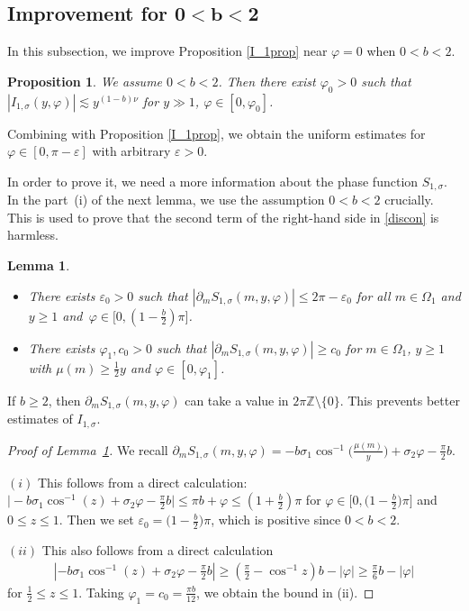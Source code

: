 \documentclass[pdftex]{sigma}
\numberwithin{equation}{section}
\newtheorem{Lemma}[Theorem]{Lemma}
\newtheorem{Proposition}[Theorem]{Proposition}
 { \theoremstyle{definition}
\newtheorem{Definition}[Theorem]{Definition}
\newtheorem{Note}[Theorem]{Note}
\newtheorem{Example}[Theorem]{Example}
\newtheorem{Remark}[Theorem]{Remark} }
\def\e{\varepsilon}
\def\f{\varphi}
\def\m{\mu}
\def\n{\nu}
\def\s{\sigma}
\def\pa{\partial}
\begin{document}
\subsection[Improvement for 0<b<2]{Improvement for $\boldsymbol{0<b<2}$}\label{subsec0b2imp}

In this subsection, we improve Proposition \ref{I_1prop} near $\f=0$ when $0<b<2$.

\begin{Proposition}\label{I_1propimp}
We assume $0<b<2$.
Then there exist $\f_0>0$ such that
$
|I_{1,\s}(y,\f)|\lesssim
y^{(1-b)\n}$ for $y\gg 1$, $ \f\in [0,\f_0]$.
\end{Proposition}

\begin{Remark}
Combining with Proposition \ref{I_1prop}, we obtain the uniform estimates for $\f\in [0,\pi-\e]$ with arbitrary $\e>0$.
\end{Remark}

In order to prove it, we need a more information about the phase function $S_{1,\s}$. In the part~(i) of the next lemma, we use the assumption $0<b<2$ crucially. This is used to prove that the second term of the right-hand side in \eqref{discon} is harmless.

\begin{Lemma}\label{S_1implem}\quad
\begin{itemize}
\item[$(i)$]
There exists $\e_0>0$ such that
$
|\pa_mS_{1,\s}(m,y,\f)|\leq 2\pi-\e_0
$
for all $m\in \Omega_1$ and $y\geq 1$ and~${\f\in \bigl[0,(1-\frac{b}{2})\pi\bigr]}$.

\item[$(ii)$] There exists $\f_1,c_0>0$ such that
$
|\pa_mS_{1,\s}(m,y,\f)|\geq c_0
$
for $m\in \Omega_1$, $y\geq 1$ with $\m(m)\geq \frac{1}{2}y$ and $\f\in [0,\f_1]$.
\end{itemize}
\end{Lemma}

\begin{Remark}
If $b\geq 2$, then $\pa_mS_{1,\s}(m,y,\f)$ can take a value in $2\pi \mathbb{Z}\setminus \{0\}$. This prevents better estimates of $I_{1,\s}$.
\end{Remark}

\begin{proof}[Proof of Lemma~\ref{S_1implem}]
We recall $\pa_mS_{1,\s}(m,y,\f)=-b\s_1\cos^{-1}\bigl(\frac{\m(m)}{y}\bigr)+\s_2\f-\frac{\pi}{2}b$.

 $(i)$
This follows from a direct calculation: $\bigl|-b\s_1\cos^{-1}(z)+\s_2\f-\frac{\pi}{2}b\bigr|\leq \pi b+\f\leq (1+\frac{b}{2})\pi$ for $\f\in \bigl[0,\bigl(1-\frac{b}{2}\bigr)\pi\bigr]$ and $0\le z\le 1$. Then we set $\e_0=\bigl(1-\frac{b}{2}\bigr)\pi$, which is positive since $0<b<2$.

 $(ii)$ This also follows from a direct calculation
\begin{align*}
\left|-b\s_1\cos^{-1}(z)+\s_2\f-\frac{\pi}{2}b\right|\geq \left(\frac{\pi}{2}-\cos^{-1}z\right)b- |\f|\geq \frac{\pi}{6}b-|\f|
\end{align*}
for $\frac{1}{2}\leq z\leq 1$. Taking $\f_1=c_0=\frac{\pi b}{12}$, we obtain the bound in (ii).
\end{proof}
\end{document}
